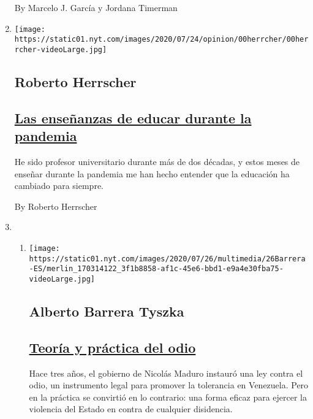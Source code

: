 \begin{enumerate}
  By Marcelo J. García y Jordana Timerman
\item
  \texttt{[image: https://static01.nyt.com/images/2020/07/24/opinion/00herrcher/00herrcher-videoLarge.jpg]}

  \hypertarget{roberto-herrscher}{%
  \subsection{Roberto Herrscher}\label{roberto-herrscher}}

  \hypertarget{las-enseuxf1anzas-de-educar-durante-la-pandemia}{%
  \subsection{\texorpdfstring{\href{/es/2020/07/27/espanol/opinion/clases-universidad-coronavirus.html}{Las
  enseñanzas de educar durante la
  pandemia}}{Las enseñanzas de educar durante la pandemia}}\label{las-enseuxf1anzas-de-educar-durante-la-pandemia}}

  He sido profesor universitario durante más de dos décadas, y estos
  meses de enseñar durante la pandemia me han hecho entender que la
  educación ha cambiado para siempre.

  By Roberto Herrscher
\item
  \begin{enumerate}
  \def\labelenumii{\arabic{enumii}.}
  \item
    \texttt{[image: https://static01.nyt.com/images/2020/07/26/multimedia/26Barrera-ES/merlin\_170314122\_3f1b8858-af1c-45e6-bbd1-e9a4e30fba75-videoLarge.jpg]}

    \hypertarget{alberto-barrera-tyszka}{%
    \subsection{Alberto Barrera Tyszka}\label{alberto-barrera-tyszka}}

    \hypertarget{teoruxeda-y-pruxe1ctica-del-odio}{%
    \subsection{\texorpdfstring{\href{/es/2020/07/26/espanol/opinion/nicmer-evans-venezuela.html}{Teoría
    y práctica del
    odio}}{Teoría y práctica del odio}}\label{teoruxeda-y-pruxe1ctica-del-odio}}

    Hace tres años, el gobierno de Nicolás Maduro instauró una ley
    contra el odio, un instrumento legal para promover la tolerancia en
    Venezuela. Pero en la práctica se convirtió en lo contrario: una
    forma eficaz para ejercer la violencia del Estado en contra de
    cualquier disidencia.


\end{enumerate}
\end{enumerate}
